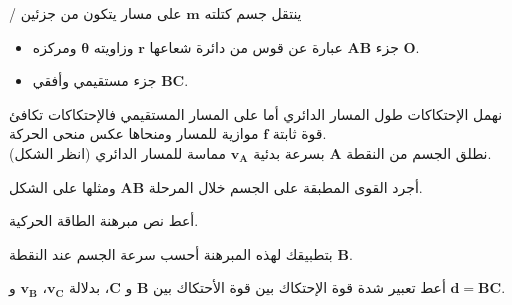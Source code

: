 \documentclass[12pt,a4paper]{article}
\begin{document}
					\begin{exercice}{}/
					ينتقل جسم كتلته 
$\bm{m}$					
					على مسار يتكون من جزئين 
					\begin{itemize}
					\item جزء 
$\bm{AB}$						
					عبارة عن قوس من دائرة شعاعها 
$\bm{r}$						
					وزاويته 
$\bm{\theta}$						
					ومركزه
$\bm{O}$.	
\item جزء مستقيمي وأفقي 
$\bm{BC}$.						
					\end{itemize}
					نهمل الإحتكاكات طول المسار الدائري أما على المسار المستقيمي فالإحتكاكات تكافئ قوة ثابتة 
$\bm{f}$						
					موازية للمسار ومنحاها عكس منحى الحركة.\\
					نطلق الجسم من النقطة 
$\bm{A}$						
					بسرعة بدئية 
$\bm{v_A}$						
					مماسة  للمسار الدائري (انظر الشكل).
					\begin{enumerate}
					\begin{minipage}[c]{0.6\linewidth}
					\item أجرد القوى المطبقة على الجسم خلال المرحلة 
$\bm{AB}$						
					ومثلها على الشكل.
					\item أعط نص مبرهنة الطاقة الحركية.
					\item بتطبيقك لهذه المبرهنة أحسب سرعة الجسم عند النقطة 
$\bm{B}$.						
					\item أعط تعبير شدة قوة الإحتكاك بين قوة الأحتكاك بين 
$\bm{B}$						
					و
$\bm{C}$،
					بدلالة
$\bm{v_C}$،
$\bm{v_B}$	
و
$\bm{d=BC}$.	
\end{minipage}
					\begin{minipage}[c]{0.38\linewidth}
\begin{flushleft}
\begin{adjustbox}{width=0.9\linewidth}
\end{adjustbox}
\end{flushleft}
\end{minipage}
\end{enumerate}
\end{exercice}
\end{document}
